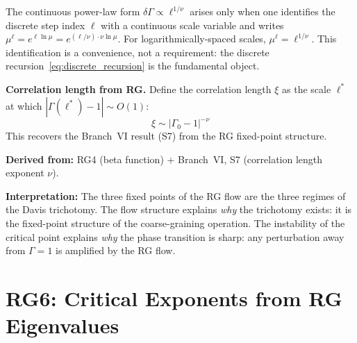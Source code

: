 \documentclass[11pt,letterpaper]{article}
\begin{document}
The continuous power-law form $\delta\Gamma \propto \ell^{1/\nu}$ 
arises only when one identifies the discrete step index $\ell$ 
with a continuous scale variable and writes $\mu^\ell = 
e^{\ell \ln \mu} = e^{(\ell/\nu) \cdot \nu \ln \mu}$. For 
logarithmically-spaced scales, $\mu^\ell = \ell^{1/\nu}$. 
This identification is a convenience, not a requirement: the 
discrete recursion~\eqref{eq:discrete_recursion} is the 
fundamental object.

\textbf{Correlation length from RG.} Define the correlation length 
$\xi$ as the scale $\ell^*$ at which 
$|\Gamma(\ell^*) - 1| \sim O(1)$:
\begin{equation}\label{eq:xi_from_rg}
    \xi \sim |\Gamma_0 - 1|^{-\nu}
\end{equation}
This recovers the Branch~VI result (S7) from the RG fixed-point 
structure.

\textbf{Derived from:} RG4 (beta function) + Branch~VI, S7 
(correlation length exponent $\nu$).

\textbf{Interpretation:} The three fixed points of the RG flow 
are the three regimes of the Davis trichotomy. The flow structure 
explains \emph{why} the trichotomy exists: it is the fixed-point 
structure of the coarse-graining operation. The instability of 
the critical point explains \emph{why} the phase transition is 
sharp: any perturbation away from $\Gamma = 1$ is amplified by 
the RG flow.

\section{RG6: Critical Exponents from RG Eigenvalues}
\end{document}
